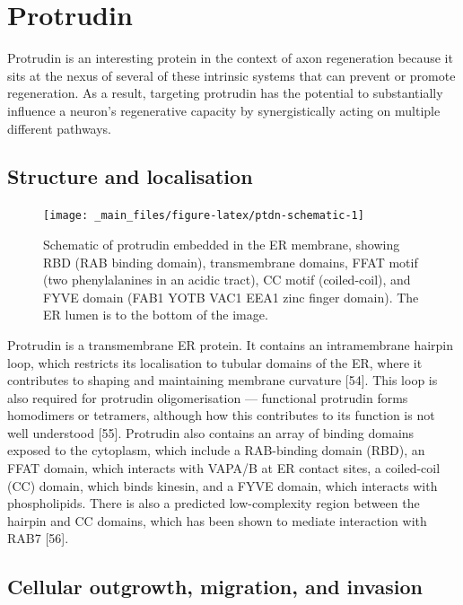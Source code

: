 \documentclass[
  12pt,
  a4paper,
]{book}
\begin{document}
\hypertarget{intro-ptdn}{%
\section{Protrudin}\label{intro-ptdn}}

Protrudin is an interesting protein in the context of axon regeneration because it sits at the nexus of several of these intrinsic systems that can prevent or promote regeneration. As a result, targeting protrudin has the potential to substantially influence a neuron's regenerative capacity by synergistically acting on multiple different pathways.

\hypertarget{structure-and-localisation}{%
\subsection{Structure and localisation}\label{structure-and-localisation}}

\begin{figure}
\texttt{[image: \_main\_files/figure-latex/ptdn-schematic-1]} \caption[Protrudin schematic]{Schematic of protrudin embedded in the ER membrane, showing RBD (RAB binding domain), transmembrane domains, FFAT motif (two phenylalanines in an acidic tract), CC motif (coiled-coil), and FYVE domain (FAB1 YOTB VAC1 EEA1 zinc finger domain).  The ER lumen is to the bottom of the image.}\label{fig:ptdn-schematic}
\end{figure}

Protrudin is a transmembrane ER protein. It contains an intramembrane hairpin loop, which restricts its localisation to tubular domains of the ER, where it contributes to shaping and maintaining membrane curvature {[}54{]}. This loop is also required for protrudin oligomerisation --- functional protrudin forms homodimers or tetramers, although how this contributes to its function is not well understood {[}55{]}. Protrudin also contains an array of binding domains exposed to the cytoplasm, which include a RAB-binding domain (RBD), an FFAT domain, which interacts with VAPA/B at ER contact sites, a coiled-coil (CC) domain, which binds kinesin, and a FYVE domain, which interacts with phospholipids. There is also a predicted low-complexity region between the hairpin and CC domains, which has been shown to mediate interaction with RAB7 {[}56{]}.

\hypertarget{cellular-outgrowth-migration-and-invasion}{%
\subsection{Cellular outgrowth, migration, and invasion}\label{cellular-outgrowth-migration-and-invasion}}
\end{document}
